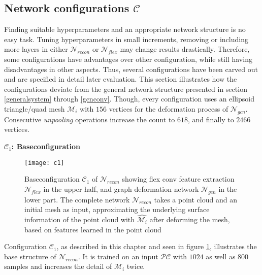 \subsection{Network configurations $\mathcal{C}$}
\label{configurations}
Finding suitable hyperparameters and an appropriate network structure 
is no easy task. Tuning hyperparameters in small increments, removing or including 
more layers in either $\mathcal{N}_{recon}$ or $\mathcal{N}_{flex}$ may change results drastically.
 Therefore, some configurations have advantages over other 
configuration, while still having disadvantages in other aspects.
Thus, several configurations have been carved out and are specified 
in detail later evaluation. This section illustrates how the configurations deviate from the general
 network structure presented in section \ref{generalsystem} through \ref{gcnconv}.
Though, every configuration uses an ellipsoid triangle/quad mesh $\mathcal{M}_{i}$ with $156$ vertices for the deformation process of $\mathcal{N}_{gcn}$.
Consecutive \emph{unpooling} operations increase the count to $618$, and finally to $2466$ vertices.

\textbf{$\mathcal{C}_1$: Baseconfiguration}
\begin{figure}
   \begin{center}
   \texttt{[image: c1]}
   \caption{Baseconfiguration $\mathcal{C}_1$ of $\mathcal{N}_{recon}$ showing flex conv feature extraction $\mathcal{N}_{flex}$ in the upper half, and
   graph deformation network $\mathcal{N}_{gcn}$ in the lower part. The complete network $\mathcal{N}_{recon}$ takes a point cloud and an initial mesh as input, 
   approximating the underlying surface information of the point cloud with $\hat{\mathcal{M}_i}$ after deforming the mesh, based on features learned in the point cloud}
    \label{fig:c1}
   \end{center}
\end{figure}
Configuration $\mathcal{C}_1$, as described in this chapter and seen in figure \ref{fig:c1},
 illustrates the base structure of $\mathcal{N}_{recon}$.
It is trained on an input $\mathcal{PC}$ with $1024$ as well as $800$ samples and increases
 the detail of $\mathcal{M}_{i}$ twice. 

